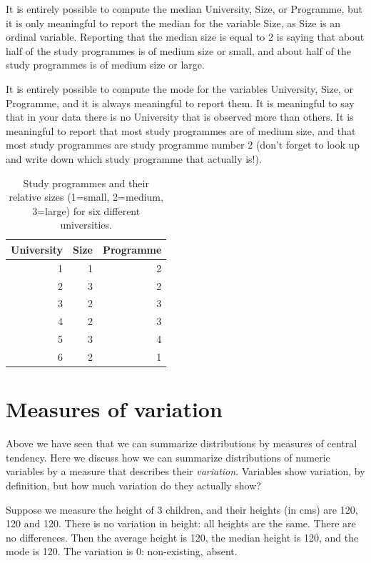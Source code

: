\documentclass[]{book}\usepackage[]{graphicx}\usepackage[]{color}
\begin{document}
It is entirely possible to compute the median University, Size, or Programme, but it is only meaningful to report the median for the variable Size, as Size is an ordinal variable. Reporting that the median size is equal to 2 is saying that about half of the study programmes is of medium size or small, and about half of the study programmes is of medium size or large.

It is entirely possible to compute the mode for the variables University, Size, or Programme, and it is always meaningful to report them. It is meaningful to say that in your data there is no University that is observed more than others. It is meaningful to report that most study programmes are of medium size, and that most study programmes are study programme number 2 (don't forget to look up and write down which study programme that actually is!).



\begin{table}[ht]
\centering
\caption{Study programmes and their relative sizes (1=small, 2=medium, 3=large) for six different universities.} 
\label{tab:modemedian}
\begin{tabular}{rrr}
  \hline
University & Size & Programme \\ 
  \hline
1 & 1 & 2 \\ 
  2 & 3 & 2 \\ 
  3 & 2 & 3 \\ 
  4 & 2 & 3 \\ 
  5 & 3 & 4 \\ 
  6 & 2 & 1 \\ 
   \hline
\end{tabular}
\end{table}





\section{Measures of variation}

Above we have seen that we can summarize distributions by measures of central tendency. Here we discuss how we can summarize distributions of numeric variables by a measure that describes their \textit{variation}. Variables show variation, by definition, but how much variation do they actually show?

Suppose we measure the height of 3 children, and their heights (in cms) are 120, 120 and 120. There is no variation in height: all heights are the same. There are no differences. Then the average height is 120, the median height is 120, and the mode is 120. The variation is 0: non-existing, absent.
\end{document}
